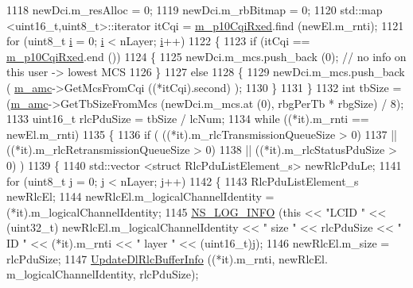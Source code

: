\begin{DoxyCode}
1118       newDci.m\_resAlloc = 0;
1119       newDci.m\_rbBitmap = 0;
1120       std::map <uint16\_t,uint8\_t>::iterator itCqi = \hyperlink{classns3_1_1RrFfMacScheduler_aabdb8d68324faae8a279df6378d589b7}{m\_p10CqiRxed}.find (newEl.m\_rnti);
1121       \textcolor{keywordflow}{for} (uint8\_t \hyperlink{bernuolliDistribution_8m_a6f6ccfcf58b31cb6412107d9d5281426}{i} = 0; \hyperlink{bernuolliDistribution_8m_a6f6ccfcf58b31cb6412107d9d5281426}{i} < nLayer; \hyperlink{bernuolliDistribution_8m_a6f6ccfcf58b31cb6412107d9d5281426}{i}++)
1122         \{
1123           \textcolor{keywordflow}{if} (itCqi == \hyperlink{classns3_1_1RrFfMacScheduler_aabdb8d68324faae8a279df6378d589b7}{m\_p10CqiRxed}.end ())
1124             \{
1125               newDci.m\_mcs.push\_back (0); \textcolor{comment}{// no info on this user -> lowest MCS}
1126             \}
1127           \textcolor{keywordflow}{else}
1128             \{
1129               newDci.m\_mcs.push\_back ( \hyperlink{classns3_1_1RrFfMacScheduler_ad4ff8c2f667affc956f298199d8c8fa5}{m\_amc}->GetMcsFromCqi ((*itCqi).second) );
1130             \}
1131         \}
1132       \textcolor{keywordtype}{int} tbSize = (\hyperlink{classns3_1_1RrFfMacScheduler_ad4ff8c2f667affc956f298199d8c8fa5}{m\_amc}->GetTbSizeFromMcs (newDci.m\_mcs.at (0), rbgPerTb * rbgSize) / 8);
1133       uint16\_t rlcPduSize = tbSize / lcNum;
1134       \textcolor{keywordflow}{while} ((*it).m\_rnti == newEl.m\_rnti)
1135         \{
1136           \textcolor{keywordflow}{if} ( ((*it).m\_rlcTransmissionQueueSize > 0)
1137                || ((*it).m\_rlcRetransmissionQueueSize > 0)
1138                || ((*it).m\_rlcStatusPduSize > 0) )
1139             \{
1140               std::vector <struct RlcPduListElement\_s> newRlcPduLe;
1141               \textcolor{keywordflow}{for} (uint8\_t j = 0; j < nLayer; j++)
1142                 \{
1143                   RlcPduListElement\_s newRlcEl;
1144                   newRlcEl.m\_logicalChannelIdentity = (*it).m\_logicalChannelIdentity;
1145                   \hyperlink{group__logging_gafbd73ee2cf9f26b319f49086d8e860fb}{NS\_LOG\_INFO} (\textcolor{keyword}{this} << \textcolor{stringliteral}{"LCID "} << (uint32\_t) newRlcEl.m\_logicalChannelIdentity 
      << \textcolor{stringliteral}{" size "} << rlcPduSize << \textcolor{stringliteral}{" ID "} << (*it).m\_rnti << \textcolor{stringliteral}{" layer "} << (uint16\_t)j);
1146                   newRlcEl.m\_size = rlcPduSize;
1147                   \hyperlink{classns3_1_1RrFfMacScheduler_a579580e9727897effc77801086e413ab}{UpdateDlRlcBufferInfo} ((*it).m\_rnti, newRlcEl.
      m\_logicalChannelIdentity, rlcPduSize);

\end{DoxyCode}
